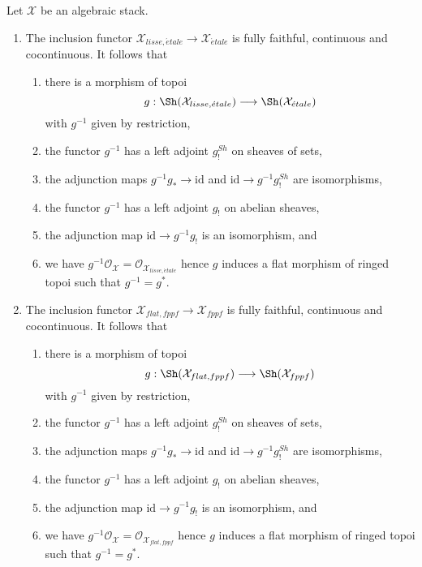 \begin{lemma}
\label{lemma-lisse-etale}
Let $\mathcal{X}$ be an algebraic stack.
\begin{enumerate}
\item The inclusion functor
$\mathcal{X}_{lisse,\acute{e}tale} \to \mathcal{X}_{\acute{e}tale}$
is fully faithful, continuous and cocontinuous. It follows that
\begin{enumerate}
\item there is a morphism of topoi
$$
g :
\Sh(\mathcal{X}_{lisse,\acute{e}tale})
\longrightarrow
\Sh(\mathcal{X}_{\acute{e}tale})
$$
with $g^{-1}$ given by restriction,
\item the functor $g^{-1}$ has a left adjoint $g_!^{Sh}$ on sheaves of sets,
\item the adjunction maps $g^{-1}g_* \to \text{id}$ and
$\text{id} \to g^{-1}g_!^{Sh}$ are isomorphisms,
\item the functor $g^{-1}$ has a left adjoint $g_!$ on abelian sheaves,
\item the adjunction map $\text{id} \to g^{-1}g_!$ is an isomorphism, and
\item we have $g^{-1}\mathcal{O}_\mathcal{X} =
\mathcal{O}_{\mathcal{X}_{lisse,\acute{e}tale}}$ hence $g$ induces a flat
morphism of ringed topoi such that $g^{-1} = g^*$.
\end{enumerate}
\item The inclusion functor
$\mathcal{X}_{flat,fppf} \to \mathcal{X}_{fppf}$
is fully faithful, continuous and cocontinuous. It follows that
\begin{enumerate}
\item there is a morphism of topoi
$$
g :
\Sh(\mathcal{X}_{flat,fppf})
\longrightarrow
\Sh(\mathcal{X}_{fppf})
$$
with $g^{-1}$ given by restriction,
\item the functor $g^{-1}$ has a left adjoint $g_!^{Sh}$ on sheaves of sets,
\item the adjunction maps $g^{-1}g_* \to \text{id}$ and
$\text{id} \to g^{-1}g_!^{Sh}$ are isomorphisms,
\item the functor $g^{-1}$ has a left adjoint $g_!$ on abelian sheaves,
\item the adjunction map $\text{id} \to g^{-1}g_!$ is an isomorphism, and
\item we have $g^{-1}\mathcal{O}_\mathcal{X} =
\mathcal{O}_{\mathcal{X}_{flat,fppf}}$ hence $g$ induces a flat
morphism of ringed topoi such that $g^{-1} = g^*$.
\end{enumerate}
\end{enumerate}
\end{lemma}


